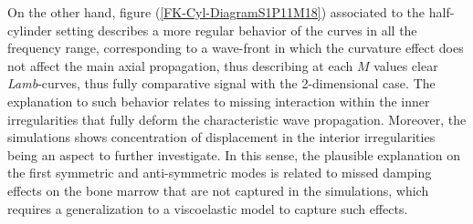 On the other hand, figure (\ref{FK-Cyl-DiagramS1P11M18}) associated to the half-cylinder setting describes a more regular behavior of the curves in all the frequency range, corresponding to a wave-front in which the curvature effect does not affect the main axial propagation, thus describing at each $M$ values clear \textit{Lamb}-curves, thus fully comparative signal with the 2-dimensional case. The explanation to such behavior relates to missing interaction within the inner irregularities that fully deform the characteristic wave propagation. Moreover, the simulations shows concentration of displacement in the interior irregularities being an aspect to further investigate. In this sense, the plausible explanation on the first symmetric and anti-symmetric modes is related to missed damping effects on the bone marrow that are not captured in the simulations, which requires a generalization to a viscoelastic model to capture such effects.


